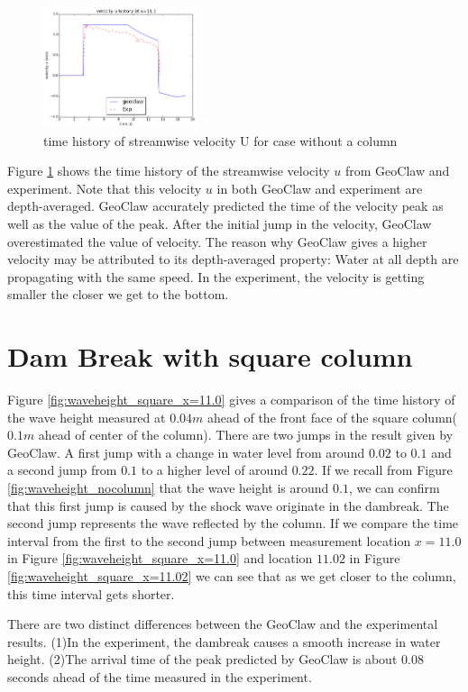 \documentclass[11pt]{article}
\begin{document}
\begin{figure}[h!]
    \centering
    \includegraphics[width=0.4\textwidth]{./plots/velocityU_nocolumn}
    \caption{time history of streamwise velocity U for case without a column}
    \label{fig:velocityU_nocolumn}
\end{figure}
Figure \ref{fig:velocityU_nocolumn} shows the time history of the streamwise velocity $u$ from GeoClaw and experiment. 
Note that this velocity $u$ in both GeoClaw and experiment are depth-averaged. 
GeoClaw accurately predicted the time of the velocity peak as well as the value of the peak. 
After the initial jump in the velocity, GeoClaw overestimated the value of velocity.
The reason why GeoClaw gives a higher velocity may be attributed to its depth-averaged property: Water at all depth are propagating with the same speed. In the experiment, the velocity is getting smaller the closer we get to the bottom. 

\section{Dam Break with square column}\label{Sec:Square}
Figure \ref{fig:waveheight_square_x=11.0} gives a comparison of the time history of the wave height measured at $0.04m$ ahead of the front face of the square column($0.1m$ ahead of center of the column).
There are two jumps in the result given by GeoClaw. A first jump with a change in water level from around $0.02$ to $0.1$ and a second jump from $0.1$ to a higher level of around $0.22$.
If we recall from Figure \ref{fig:waveheight_nocolumn} that the wave height is around $0.1$, we can confirm that this first jump is caused by the shock wave originate in the dambreak. The second jump represents the wave reflected by the column.  
If we compare the time interval from the first to the second jump between measurement location $x=11.0$ in Figure \ref{fig:waveheight_square_x=11.0} and location $11.02$ in Figure \ref{fig:waveheight_square_x=11.02} we can see that as we get closer to the column, this time interval gets shorter.
\par
There are two distinct differences between the GeoClaw and the experimental results. (1)In the experiment, the dambreak causes a smooth increase in water height. (2)The arrival time of the peak predicted by GeoClaw is about $0.08$ seconds ahead of the time measured in the experiment.  
\par
\end{document}
